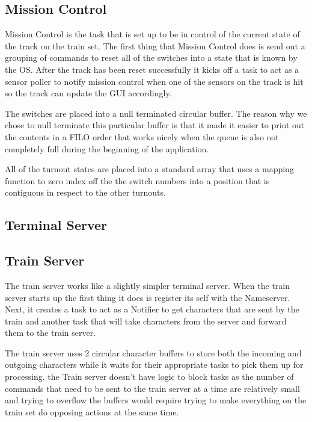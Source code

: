 \documentclass[pdftex,10pt,a4paper]{article}
\begin{document}
\subsection*{Mission Control}

Mission Control is the task that is set up to be in control of the current
state of the track on the train set. The first thing that Mission Control
does is send out a grouping of commands to reset all of the switches into a
state that is known by the OS. After the track has been reset successfully
it kicks off a task to act as a sensor poller to notify mission control when
one of the sensors on the track is hit so the track can update the GUI
accordingly.

The switches are placed into a null terminated circular buffer. The reason why
we chose to null terminate this particular buffer is that it made it easier to
print out the contents in a FILO order that works nicely when the queue is
also not completely full during the beginning of the application.

All of the turnout states are placed into a standard array that uses a mapping
function to zero index off the the switch numbers into a position that is
contiguous in respect to the other turnouts.

\subsection*{Terminal Server}

\subsection*{Train Server}

The train server works like a slightly simpler terminal server. When the train
server starts up the first thing it does is register its self with the
Nameserver. Next, it creates a task to act as a Notifier to get characters that
are sent by the train and another task that will take characters from the
server and forward them to the train server.

The train server uses 2 circular character buffers to store both the incoming
and outgoing characters while it waits for their appropriate tasks to pick them
up for processing. the Train server doesn't have logic to block tasks as the
number of commands that need to be sent to the train server at a time are
relatively small and trying to overflow the buffers would require trying to
make everything on the train set do opposing actions at the same time.
\end{document}
